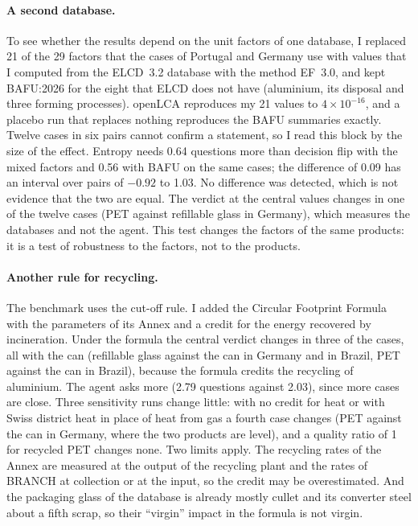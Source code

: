 \documentclass{article}
\begin{document}
\paragraph{A second database.}
To see whether the results depend on the unit factors of one database, I replaced 21 of the 29 factors
that the cases of Portugal and Germany use with values that I computed from the ELCD~3.2 database
\citep{elcd2022} with the method EF~3.0, and kept BAFU:2026 for the eight that ELCD does not have
(aluminium, its disposal and three forming processes). openLCA reproduces my 21 values to
$4\times10^{-16}$, and a placebo run that replaces nothing reproduces the BAFU summaries exactly. Twelve
cases in six pairs cannot confirm a statement, so I read this block by the size of the effect. Entropy
needs 0.64 questions more than decision flip with the mixed factors and 0.56 with BAFU on the same cases;
the difference of 0.09 has an interval over pairs of $-0.92$ to 1.03. No difference was detected, which is
not evidence that the two are equal. The verdict at the central values changes in one of the twelve
cases (PET against refillable glass in Germany), which measures the databases and not the agent. This
test changes the factors of the same products: it is a test of robustness to the factors, not to the products.

\paragraph{Another rule for recycling.}
The benchmark uses the cut-off rule. I added the Circular Footprint Formula \citep{zampori2019} with the
parameters of its Annex \citep{annexc2020} and a credit for the energy recovered by incineration. Under
the formula the central verdict changes in three of the \nCases{} cases, all with the can (refillable
glass against the can in Germany and in Brazil, PET against the can in Brazil), because the formula
credits the recycling of aluminium. The agent asks more (2.79 questions against 2.03), since more cases
are close. Three sensitivity runs change little: with no credit for heat or with Swiss district heat in
place of heat from gas a fourth case changes (PET against the can in Germany, where the two products are
level), and a quality ratio of 1 for recycled PET changes none. Two limits apply. The recycling rates of
the Annex are measured at the output of the recycling plant and the rates of BRANCH at collection or at
the input, so the credit may be overestimated. And the packaging glass of the database is already mostly
cullet and its converter steel about a fifth scrap, so their ``virgin'' impact in the formula is
not virgin.
\end{document}
